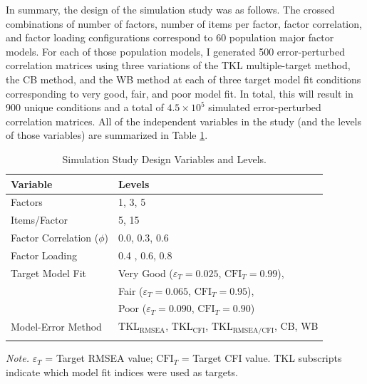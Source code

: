 \documentclass[11pt]{umnthesis}
\begin{document}
In summary, the design of the simulation study was as follows. The crossed combinations of number of factors, number of items per factor, factor correlation, and factor loading configurations correspond to 60 population major factor models. For each of those population models, I generated 500 error-perturbed correlation matrices using three variations of the TKL multiple-target method, the CB method, and the WB method at each of three target model fit conditions corresponding to very good, fair, and poor model fit. In total, this will result in 900 unique conditions and a total of \ensuremath{4.5\times 10^{5}} simulated error-perturbed correlation matrices. All of the independent variables in the study (and the levels of those variables) are summarized in Table \ref{tab:study1-variables}.

\begin{table}[tbp]

\begin{center}
\begin{threeparttable}

\caption{\label{tab:study1-variables}Simulation Study Design Variables and Levels.}

\begin{tabular}{ll}
\toprule
Variable & Levels\\
\midrule
Factors & 1, 3, 5\\
Items/Factor & 5, 15\\
Factor Correlation ($\phi$) & 0.0, 0.3, 0.6\\
Factor Loading & 0.4 , 0.6, 0.8\\
Target Model Fit & Very Good ($\varepsilon_T = 0.025$, $\textrm{CFI}_T = 0.99$),\\
 & Fair ($\varepsilon_T = 0.065$, $\textrm{CFI}_T = 0.95$),\\
 & Poor ($\varepsilon_T = 0.090$, $\textrm{CFI}_T = 0.90$)\\
Model-Error Method & $\textrm{TKL}_{\textrm{RMSEA}}$, $\textrm{TKL}_{\textrm{CFI}}$, $\textrm{TKL}_{\textrm{RMSEA/CFI}}$, CB, WB\\
\bottomrule
\addlinespace
\end{tabular}

\begin{tablenotes}[para]
\normalsize{\textit{Note.} $\varepsilon_T$ = Target RMSEA value; $\textrm{CFI}_T$ = Target CFI value. TKL subscripts indicate which model fit indices were used as targets.}
\end{tablenotes}

\end{threeparttable}
\end{center}

\end{table}
\end{document}
